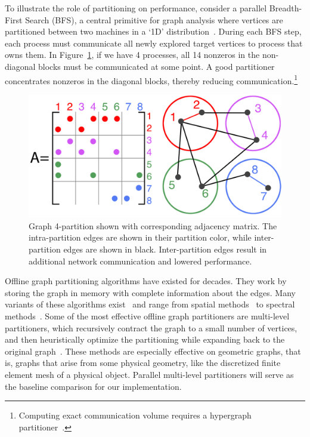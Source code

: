 To illustrate the role of partitioning on performance, consider a parallel Breadth-First Search (BFS), a central primitive for graph analysis where vertices are partitioned between two machines in a `1D' distribution~\cite{Buluc2D}. During each BFS step, each process must communicate all newly explored target vertices to process that owns them. In Figure~\ref{fig:0}, if we have 4 processes, all 14 nonzeros in the non-diagonal blocks must be communicated at some point. A good partitioner concentrates nonzeros in the diagonal blocks, thereby reducing communication.\footnote{Computing exact communication volume requires a hypergraph partitioner~\cite{hypergraph}.} 
\begin{figure}[h]
\centering
\includegraphics[width=0.85\columnwidth] {figures/graphpart1.pdf}
\caption[Caption for]{Graph 4-partition shown with corresponding adjacency matrix. The intra-partition edges are shown in their partition color, while inter-partition edges are shown in black.  Inter-partition edges result in additional network communication and lowered performance. }
\label{fig:0}
\end{figure}

Offline graph partitioning algorithms have existed for dec\-ades. They work by storing the graph in memory with complete information about the edges. Many variants of these algorithms exist~\cite{gpsurvey} and range from spatial methods~\cite{Gilbert95geometricmesh} to spectral methods~\cite{arora2009expander}. Some of the most effective offline graph partitioners are multi-level partitioners, which recursively contract the graph to a small number of vertices, and then heuristically optimize the partitioning while expanding back to the original graph~\cite{karypis1998multilevel}.
These methods are especially effective on geometric graphs, that is, graphs that arise from some physical geometry, like the discretized finite element mesh of a physical object.
Parallel multi-level partitioners will serve as the baseline comparison for our implementation. 

